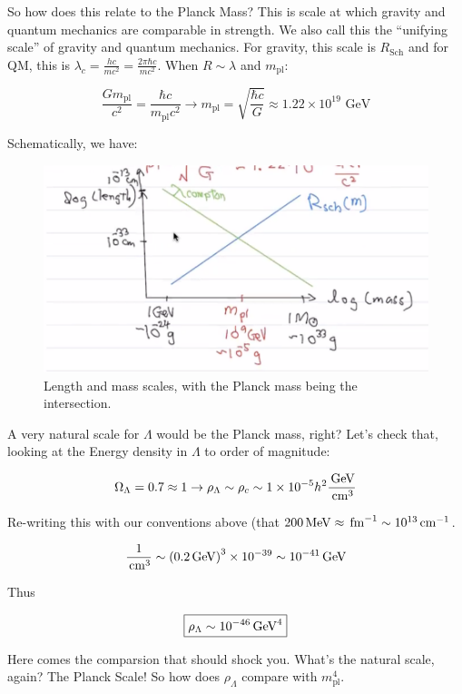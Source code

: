 \documentclass{article}
\newcommand{\unit}[1]{{\,\rm #1}}
\newcommand{\be}{\begin{equation}}
\newcommand{\ee}{\end{equation}}
\newcommand{\cm}{\unit{cm}}
\begin{document}
So how does this relate to the Planck Mass? This is scale at which gravity and quantum mechanics are comparable in strength. We also call this the ``unifying scale'' of gravity and quantum mechanics. For gravity, this scale is $R_\text{Sch}$ and for QM, this is $\lambda_c = \frac{hc}{mc^2} = \frac{2\pi \hbar c}{mc^2}$. When $R\sim \lambda$ and $m_\text{pl}$:

$$
\frac{G m_\text{pl}}{c^2} = \frac{\hbar c}{m_\text{pl}c^2} \rightarrow \boxed{m_\text{pl} = \sqrt{\frac{\hbar c}{G}} \approx 1.22\times 10^{19} \text{ GeV} }
$$

Schematically, we have:

\begin{figure}
    \centering
    \includegraphics{scales.png}
    \caption{Length and mass scales, with the Planck mass being the intersection. }
    \label{fig:scales}
\end{figure}

A very natural scale for $\Lambda$ would be the Planck mass, right? Let's check that, looking at the Energy density in $\Lambda$ to order of magnitude:

\be
\Omega_\Lambda = 0.7 \approx 1 \rightarrow \rho_\Lambda \sim \rho_{c} \sim 1 \times 10^{-5} h^2 \frac{\unit{GeV}}{\unit{cm}^3}
\ee

Re-writing this with our conventions above (that $200 \unit{MeV} \approx \unit{fm}^{-1} \sim 10^{13} \cm^{-1}$. 

\be
\frac{1}{\cm^3} \sim \left(0.2 \unit{GeV}\right)^3\times 10^{-39} \sim 10^{-41} \unit{GeV}
\ee

Thus

\be
\boxed{\rho_\Lambda \sim 10^{-46} \unit{GeV}^4} 
\ee

Here comes the comparsion that should shock you. What's the natural scale, again? The Planck Scale! So how does $\rho_\Lambda$ compare with $m_\text{pl}^4$. 
\end{document}
